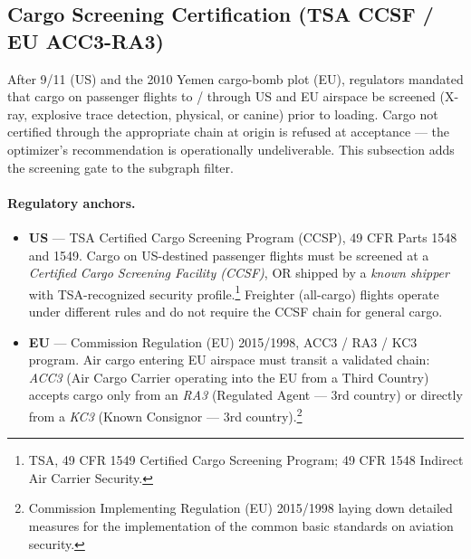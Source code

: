 \documentclass[11pt,a4paper]{article}
\theoremstyle{definition}
\begin{document}
\subsection{Cargo Screening Certification (TSA CCSF / EU ACC3-RA3)}
\label{sec:screening}

After 9/11 (US) and the 2010 Yemen cargo-bomb plot (EU), regulators mandated that
cargo on passenger flights to / through US and EU airspace be screened (X-ray,
explosive trace detection, physical, or canine) prior to loading. Cargo not certified
through the appropriate chain at origin is refused at acceptance --- the optimizer's
recommendation is operationally undeliverable. This subsection adds the screening
gate to the subgraph filter.

\paragraph{Regulatory anchors.}
\begin{itemize}[noitemsep]
  \item \textbf{US} --- TSA Certified Cargo Screening Program (CCSP), 49 CFR Parts 1548
        and 1549. Cargo on US-destined passenger flights must be screened at a
        \emph{Certified Cargo Screening Facility (CCSF)}, OR shipped by a \emph{known
        shipper} with TSA-recognized security profile.\footnote{TSA, 49 CFR 1549
        Certified Cargo Screening Program; 49 CFR 1548 Indirect Air Carrier Security.}
        Freighter (all-cargo) flights operate under different rules and do not require
        the CCSF chain for general cargo.
  \item \textbf{EU} --- Commission Regulation (EU) 2015/1998, ACC3 / RA3 / KC3 program.
        Air cargo entering EU airspace must transit a validated chain: \emph{ACC3}
        (Air Cargo Carrier operating into the EU from a Third Country) accepts cargo
        only from an \emph{RA3} (Regulated Agent --- 3rd country) or directly from a
        \emph{KC3} (Known Consignor --- 3rd country).\footnote{Commission Implementing
        Regulation (EU) 2015/1998 laying down detailed measures for the implementation
        of the common basic standards on aviation security.}
\end{itemize}
\end{document}
